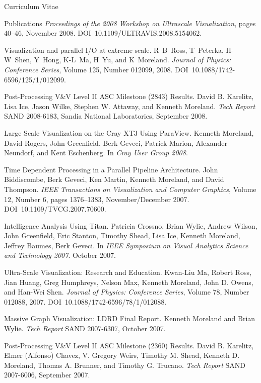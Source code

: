 \documentclass{article}
\begin{document}
\begin{cv}{Curriculum Vitae}
\begin{cvlist}{Publications}
      \emph{Proceedings of the 2008 Workshop on Ultrascale Visualization},
      pages 40--46, November 2008. DOI~10.1109/ULTRAVIS.2008.5154062.
    \item[Visualization and parallel I/O at extreme scale.] R~B~Ross,
      T~Peterka, H-W~Shen, Y~Hong, K-L~Ma, H~Yu, and
      K~Moreland. \emph{Journal of Physics: Conference Series}, Volume 125,
      Number 012099, 2008. DOI~10.1088/1742-6596/125/1/012099.
    \item[Post-Processing V\&V Level II ASC Milestone (2843) Results.] David
      B. Karelitz, Lisa Ice, Jason Wilke, Stephen W. Attaway, and Kenneth
      Moreland. \emph{Tech Report} SAND 2008-6183, Sandia National
      Laboratories, September 2008.
    \item[Large Scale Visualization on the Cray XT3 Using ParaView.]
      Kenneth Moreland, David Rogers, John Greenfield, Berk Geveci, Patrick
      Marion, Alexander Neundorf, and Kent Eschenberg. In \emph{Cray User
        Group 2008}.
    \item[Time Dependent Processing in a Parallel Pipeline Architecture.]
      John Biddiscombe, Berk Geveci, Ken Martin, Kenneth Moreland, and
      David Thompson.  \emph{IEEE Transactions on Visualization and
        Computer Graphics}, Volume 12, Number 6, pages 1376--1383,
      November/December 2007.  DOI~10.1109/TVCG.2007.70600.
    \item[Intelligence Analysis Using Titan.] Patricia Crossno, Brian
      Wylie, Andrew Wilson, John Greenfield, Eric Stanton, Timothy Shead,
      Lisa Ice, Kenneth Moreland, Jeffrey Baumes, Berk Geveci. In
      \emph{IEEE Symposium on Visual Analytics Science and Technology
        2007}. October 2007.
    \item[Ultra-Scale Visualization: Research and Education.] Kwan-Liu Ma,
      Robert Ross, Jian Huang, Greg Humphreys, Nelson Max, Kenneth
      Moreland, John D. Owens, and Han-Wei Shen. \emph{Journal of Physics:
        Conference Series}, Volume 78, Number 012088,
      2007. DOI~10.1088/1742-6596/78/1/012088.
    \item[Massive Graph Visualization: LDRD Final Report.] Kenneth Moreland
      and Brian Wylie.  \emph{Tech Report} SAND 2007-6307, October 2007.
    \item[Post-Processing V\&V Level II ASC Milestone (2360) Results.]
      David B. Karelitz, Elmer (Alfonso) Chavez, V. Gregory Weirs, Timothy
      M. Shead, Kenneth D. Moreland, Thomas A. Brunner, and Timothy
      G. Trucano.  \emph{Tech Report} SAND 2007-6006, September 2007.

\end{cvlist}
\end{cv}
\end{document}
